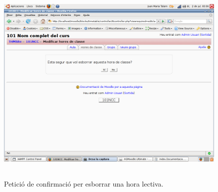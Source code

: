 \documentclass[a4paper]{report}  %
\begin{document}
\begin{itemize}
\begin{figure}[H]
\begin{center}
		\includegraphics[height=10cm,width=12cm]{img/HourtableConfirm.png}
		\caption[List caption]{Petició de confirmació per esborrar una hora lectiva.}
		\label{fig:HourtableConfirm}
		\end{center}
		\end{figure}
\end{itemize}
\end{document}
